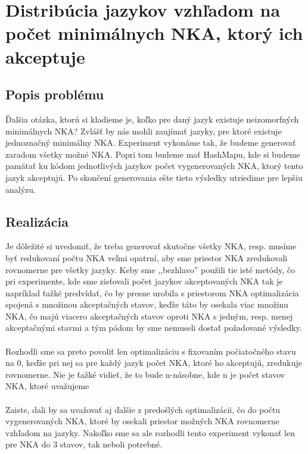 \section{Distribúcia jazykov vzhľadom na počet minimálnych NKA, ktorý ich akceptuje}

\subsection{Popis problému}
Ďalšia otázka, ktorú si kladieme je, koľko pre daný jazyk existuje neizomorfných minimálnych NKA? Zvlášť by nás mohli zaujímať jazyky, pre ktoré existuje jednoznačný minimálny NKA. Experiment vykonáme tak, že budeme generovať zaradom všetky možné NKA. Popri tom budeme mať HashMapu, kde si budeme pamätať ku kódom jednotlivých jazykov počet vygenerovaných NKA, ktorý tento jazyk akceptujú. Po skončení generovania ešte tieto výsledky utriedime pre lepšiu analýzu.

\subsection{Realizácia}
Je dôležité si uvedomiť, že treba generovať skutočne všetky NKA, resp. musíme byť redukovaní počtu NKA veľmi opatrní, aby sme priestor NKA zredukovali rovnomerne pre všetky jazyky. Keby sme ,,bezhlavo'' použili tie isté metódy, čo pri experimente, kde sme zisťovali počet jazykov akceptovaných NKA tak je napríklad ťažké predvídať, čo by presne urobila s priestorom NKA optimalizácia spojená s množinou akceptačných stavov, keďže táto by osekala viac množinu NKA, čo majú viacero akceptačných stavov oproti NKA s jedným, resp. menej akceptačnými stavmi a tým pádom by sme nemuseli dostať požadované výsledky. 
\paragraph{}
Rozhodli sme sa preto povoliť len optimalizáciu s fixovaním počiatočného stavu na 0, keďže pri nej sa pre každý jazyk počet NKA, ktoré ho akceptujú, zredukuje rovnomerne. Nie je ťažké vidieť, že to bude n-násobne, kde n je počet stavov NKA, ktoré uvažujeme
\paragraph{}
Zaiste, dali by sa uvažovať aj ďalšie z predošlých optimalizácii, čo do počtu vygenerovaných NKA, ktoré by osekali priestor možných NKA rovnomerne vzhľadom na jazyky. Nakoľko sme sa ale rozhodli tento experiment vykonať len pre NKA do 3 stavov, tak neboli potrebné. 

